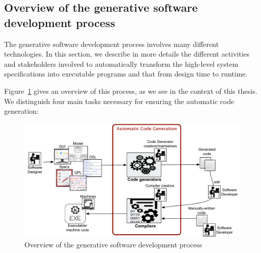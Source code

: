 

\subsection{Overview of the generative software development process}
The generative software development process involves many different technologies. In this section, we describe in more details the different activities and stakeholders involved to automatically transform the high-level system specifications into executable programs and that from design time to runtime.

Figure~\ref{fig:background_overview2} gives an overview of this process, as we see in the context of this thesis. We distinguish four main tasks necessary for ensuring the automatic code generation: 

\begin{figure}[h]
	\center
	\includegraphics[scale=0.65]{Background/fig/background_overview2.pdf}
	\caption{Overview of the generative software development process}
	\label{fig:background_overview2}
\end{figure}

